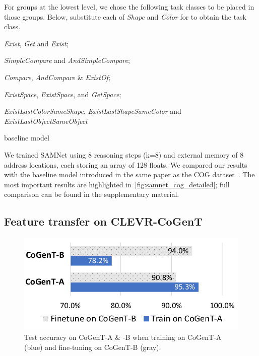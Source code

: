 For groups at the lowest level, we chose the following task classes to be placed in those groups.
Below, substitute each of \textit{Shape} and \textit{Color} for  \uX{} to obtain the task class.
\begin{description}
	\compresslist
	\item[Basic:] \textit{Exist}\uX, \textit{Get}\uX{} and \textit{Exist};
	\item[Obj-Attr:] \emph{SimpleCompare}\uX{} and \textit{AndSimpleCompare}\uX;
	\item[Compare:] \textit{Compare}\uX,  \textit{AndCompare}\uX{} \& \textit{Exist}\uX\textit{Of};
	\item[Spatial:] \textit{ExistSpace}, \textit{Exist}\uX\textit{Space}, and \textit{Get}\uX\textit{Space};
	\item[Cognitive:] \textit{ExistLastColorSameShape}, \textit{ExistLastShapeSameColor} and \textit{ExistLastObjectSameObject}
\end{description}



baseline model~\cite{yang2018dataset}

We trained SAMNet using 8 reasoning steps (k=8) and external memory of 8 address locations, each storing an array of 128 floats. 
We compared our results with the baseline model introduced in the same paper as the COG dataset~\cite{yang2018dataset}.
The most important results are highlighted in~\cref{fig:samnet_cog_detailed}; full comparison can be found in the supplementary material.%



\newpage
\subsection{Feature transfer on CLEVR-CoGenT}



\begin{figure}[htbp]
	\centering
	\includegraphics[width=0.8\columnwidth]{../results/CoGenT_B_results.pdf}
	\caption{Test accuracy on CoGenT-A \& -B when training on CoGenT-A (blue) and fine-tuning on CoGenT-B (gray).}
	\label{fig:CoGenT-B-results}
\end{figure}




